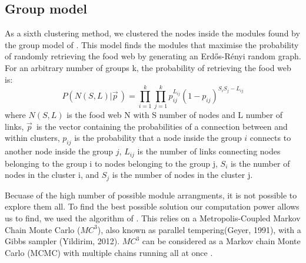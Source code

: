 \documentclass[twocolumn]{article}
\begin{document}
	\subsection*{Group model}
		\par
		As a sixth clustering method, we clustered the nodes inside the modules found by the group model of \citep{Allesina2009a}. This model finds the modules that maximise the probability of randomly retrieving the food web by generating an Erdős-Rényi random graph. For an arbitrary number of groups k, the probability of retrieving  the food web is:
		\begin{equation}
			P(N(S,L)|\vec{p}^{\,})=\prod_{i=1}^k\prod_{j=1}^k p_{ij}^{L_{ij}} (1-p_{ij})^{S_i S_j - L_{ij}}
		\end{equation}
		where $N(S,L)$ is the food web N with S number of nodes and L number of links,  $\vec{p}^{\,}$ is the vector containing the probabilities of a connection between and within clusters, $p_{ij}$
		is the probability that a node inside the group $i$ connects to another node inside the group $j$, $L_{ij}$ is the number of links connecting nodes belonging to the group i to nodes belonging to the group j, $S_i$ is the number of nodes in the cluster i,  and $S_j$ is the number of nodes in the cluster j.
		\par
		Becuase of the high number of possible module arrangments, it is not possible to explore them all.
		To find the best possible solution our computation power allows us to find, we used the algorithm of \citet{Sander2015}.
		This relies on a Metropolis-Coupled Markov Chain Monte Carlo ($MC^3$), also known as parallel tempering(Geyer, 1991), with a Gibbs sampler (Yildirim, 2012).
		$MC^3$ can be considered as a Markov chain Monte Carlo (MCMC) with multiple chains running all at once \citep{Sander2015}.
\end{document}
